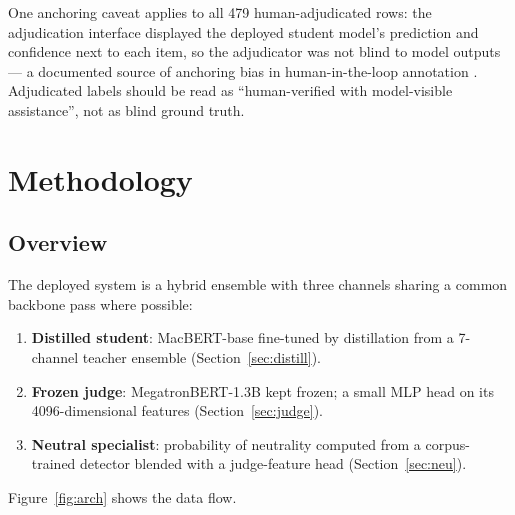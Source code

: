 \documentclass[11pt,a4paper]{article}
\begin{document}
One anchoring caveat applies to all 479 human-adjudicated rows: the
adjudication interface displayed the deployed student model's
prediction and confidence next to each item, so the adjudicator was
not blind to model outputs --- a documented source of anchoring bias
in human-in-the-loop annotation \citep{schroeder2025}. Adjudicated
labels should be read as ``human-verified with model-visible
assistance'', not as blind ground truth.

\section{Methodology}
\label{sec:method}

\subsection{Overview}

The deployed system is a hybrid ensemble with three channels sharing a
common backbone pass where possible:

\begin{enumerate}
  \item \textbf{Distilled student}: MacBERT-base fine-tuned by
        distillation from a 7-channel teacher ensemble (Section~\ref{sec:distill}).
  \item \textbf{Frozen judge}: MegatronBERT-1.3B kept frozen; a small MLP
        head on its 4096-dimensional features (Section~\ref{sec:judge}).
  \item \textbf{Neutral specialist}: probability of neutrality computed
        from a corpus-trained detector blended with a judge-feature
        head (Section~\ref{sec:neu}).
\end{enumerate}

Figure~\ref{fig:arch} shows the data flow.
\end{document}
